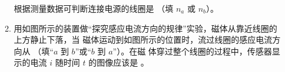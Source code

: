 \begin{enumerate}
\begin{enumerate}
根据测量数据可判断连接电源的线圈是 \underlinegap （填 $ n_a $ 或 $ n_b $）。

\item 
用如图所示的装置做“探究感应电流方向的规律”实验，磁体从靠近线圈的上方静止下落，当 
磁体运动到如图所示的位置时，流过线圈的感应电流方向从 \underlinegap（填“$ a $ 到 $ b $”或“$ b $ 到 $ a $”）。在磁
体穿过整个线圈的过程中，传感器显示的电流 $ i $ 随时间 $ t $ 的图像应该是 \underlinegap 。
\pfourchoices
{}
{}
{}
{}




\end{enumerate}











\end{enumerate}


